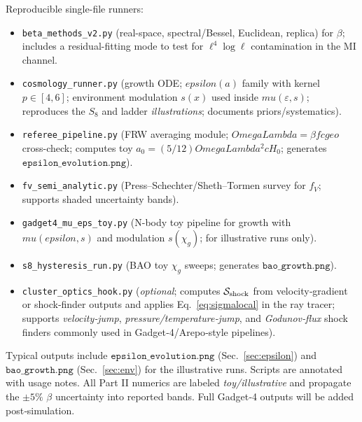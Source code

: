 \documentclass[aps,prd,onecolumn,superscriptaddress,nofootinbib]{revtex4-2}
\def\OmL{OmegaLambda}%
\def\cgeo{cgeo}%
\def\eps{epsilon}%
\def\mu{mu}%
\def\Omega_\Lambda{OmegaLambda}%
\providecommand{\OmL}{\Omega_\Lambda}
\providecommand{\cgeo}{c_{\rm geo}}
\providecommand{\eps}{\varepsilon}
\begin{document}
\medskip
Reproducible single-file runners:
\begin{itemize}[leftmargin=*]
\item \texttt{beta\_methods\_v2.py} (real-space, spectral/Bessel, Euclidean, replica) for \(\beta\); includes a residual-fitting mode to test for \(\ell^4\log\ell\) contamination in the MI channel.
\item \texttt{cosmology\_runner.py} (growth ODE; $\eps(a)$ family with kernel $p\in[4,6]$; environment modulation $s(x)$ used inside $\mu(\varepsilon,s)$; reproduces the $S_8$ and ladder \emph{illustrations}; documents priors/systematics).
\item \texttt{referee\_pipeline.py} (FRW averaging module; \(\OmL=\beta f\cgeo\) cross-check; computes toy \(a_0=(5/12)\OmL^2 c H_0\); generates \(\texttt{epsilon\_evolution.png}\)).
\item \texttt{fv\_semi\_analytic.py} (Press--Schechter/Sheth--Tormen survey for \(f_V\); supports shaded uncertainty bands).
\item \texttt{gadget4\_mu\_eps\_toy.py} (N-body toy pipeline for growth with \(\mu(\eps,s)\) and modulation \(s(\chi_g)\); for illustrative runs only).
\item \texttt{s8\_hysteresis\_run.py} (BAO toy \(\chi_g\) sweeps; generates \(\texttt{bao\_growth.png}\)).
\item \texttt{cluster\_optics\_hook.py} (\emph{optional}; computes \(\mathcal S_{\rm shock}\) from velocity‑gradient or shock‑finder outputs and applies Eq.~\eqref{eq:sigmalocal} in the ray tracer; supports \emph{velocity‑jump}, \emph{pressure/temperature‑jump}, and \emph{Godunov‑flux} shock finders commonly used in Gadget‑4/Arepo‑style pipelines).
\end{itemize}
Typical outputs include \(\texttt{epsilon\_evolution.png}\) (Sec.~\ref{sec:epsilon}) and \(\texttt{bao\_growth.png}\) (Sec.~\ref{sec:env}) for the illustrative runs. Scripts are annotated with usage notes. All Part II numerics are labeled \emph{toy/illustrative} and propagate the \(\pm 5\%\) \(\beta\) uncertainty into reported bands. Full Gadget‑4 outputs will be added post‑simulation.
\end{document}
